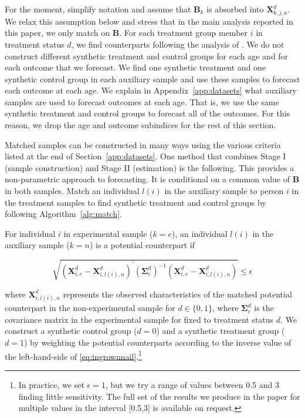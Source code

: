 \noindent For the moment, simplify notation and assume that $\bm{B}_k$ is absorbed into $\bm{X}^d_{k,j,a}$. We relax this assumption below and stress that in the main analysis reported in this paper, we only match on $\bm{B}$. For each treatment group member $i$ in treatment status $d$, we find counterparts following the analysis of \citet{Heckman_Ichimura_etal_1998_REStud}. We do not construct different synthetic treatment and control groups for each age and for each outcome that we forecast. We find one synthetic treatment and one synthetic control group in each auxiliary sample and use these samples to forecast each outcome at each age. We explain in Appendix~\ref{app:datasets} what auxiliary samples are used to forecast outcomes at each age. That is, we use the same synthetic treatment and control groups to forecast all of the outcomes. For this reason, we drop the age and outcome subindices for the rest of this section.

\noindent Matched samples can be constructed in many ways using the various criteria listed at the end of Section~\ref{app:datasets}. One method that combines Stage I (sample construction) and Stage II (estimation) is the following. This provides a non-parametric approach to forecasting. It is conditional on a common value of $\bm{B}$ in both samples. Match an individual $l(i)$ in the auxiliary sample to person $i$ in the treatment samples to find synthetic treatment and control groups by following Algorithm~\ref{alg:match}.

\onehalfspacing
\begin{algorithm} \label{alg:match}
For individual $i$ in experimental sample ($k=e$), an individual $l(i)$ in the auxiliary sample ($k=n$) is a potential counterpart if

\begin{equation}\label{eq:ingrownnail}
\sqrt{(\bm{X}^d_{i,e} - \bm{X}^d_{i,l(i),n})^\prime (\bm{\Sigma}^d_e)^{-1} (\bm{X}^d_{i,e} - \bm{X}^d_{i,l(i),n})} \leq \epsilon
\end{equation}

\noindent where $\bm{X}^d_{i,l(i),n}$ represents the observed characteristics of the matched potential counterpart in the non-experimental sample for $d \in \{0,1\}$, where $\bm{\Sigma}^d_e$ is the covariance matrix in the experimental sample for fixed to treatment status $d$. We construct a synthetic control group ($d = 0$) and a synthetic treatment group ($d = 1$) by weighting the potential counterparts according to the inverse value of the left-hand-side of \eqref{eq:ingrownnail}.\footnote{In practice, we set $\epsilon = 1$, but we try a range of values between 0.5 and 3 finding little sensitivity. The full set of the results we produce in the paper for multiple values in the interval [0.5,3] is available on request.}
\end{algorithm}
\doublespacing

